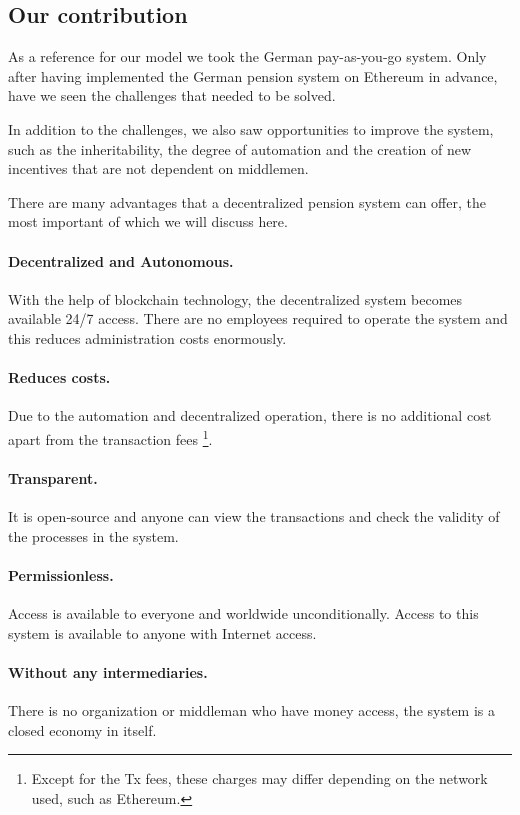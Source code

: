 \subsection{Our contribution}
As a reference for our model we took the German pay-as-you-go system. Only after having implemented the German pension system on Ethereum in advance, have we seen the challenges that needed to be solved.

In addition to the challenges, we also saw opportunities to improve the system, such as the inheritability, the degree of automation and the creation of new incentives that are not dependent on middlemen.

There are many advantages that a decentralized pension system can offer, the most important of which we will discuss here.

\paragraph{Decentralized and Autonomous.} With the help of blockchain technology, the decentralized system becomes available 24/7 access. There are no employees required to operate the system and this reduces administration costs enormously.

\paragraph{Reduces costs.} Due to the automation and decentralized operation, there is no additional cost apart from the transaction fees \footnote{Except for the Tx fees, these charges may differ depending on the network used, such as Ethereum.}.

\paragraph{Transparent.} It is open-source and anyone can view the transactions and check the validity of the processes in the system.

\paragraph{Permissionless.} 
Access is available to everyone and worldwide unconditionally. Access to this system is available to anyone with Internet access.

\paragraph{Without any intermediaries.} 
There is no organization or middleman who have money access, the system is a closed economy in itself.

